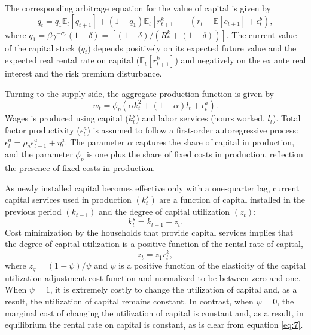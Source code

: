 \documentclass[11pt]{article}
\newcommand{\E}{\mathbb{E}}
\newcommand{\yobs}[1]{w_{#1}}
\newcommand{\lobs}[1]{l_{#1}}
\newcommand{\robs}[1]{r_{#1}}
\newcommand{\piobs}[1]{c_{#1}}
\newcommand{\Output}{Wages}
\newcommand{\hours}{hours worked}
\newcommand{\realinterest}{real interest}
\newcommand{\labor}{labor}
\begin{document}
The corresponding arbitrage equation for the value of capital is given
by \begin{equation}
q_t = q_1\E_t[q_{t+1}] + (1-q_1)\E_t[r_{t+1}^k] - (\robs{t} -
\E[\piobs{t+1}] + \epsilon_t^b),
\end{equation} where
\(q_1 = \beta\gamma^{-\sigma_c}(1-\delta) = [(1-\delta)/(R_*^k + (1-\delta))]\).
The current value of the capital stock (\(q_t\)) depends positively on
its expected future value and the expected real rental rate on capital
(\(\E_t[r_{t+1}^k]\)) and negatively on the ex ante \realinterest{} and
the risk premium disturbance.

Turning to the supply side, the aggregate production function is given
by \begin{equation}
  \yobs{t} = \phi_p(\alpha k_t^2 + (1-\alpha)\lobs{t} + \epsilon_t^a).
\end{equation} \Output{} is produced using capital (\(k_t^s\)) and
\labor{} services (\hours, \(\lobs{t}\)). Total factor productivity
(\(\epsilon_t^a\)) is assumed to follow a first-order autoregressive
process: \(\epsilon_t^a = \rho_a \epsilon_{t-1}^a + \eta_t^a\). The
parameter \(\alpha\) captures the share of capital in production, and
the parameter \(\phi_p\) is one plus the share of fixed costs in
production, reflection the presence of fixed costs in production.

As newly installed capital becomes effective only with a one-quarter
lag, current capital services used in production \((k_t^s)\) are a
function of capital installed in the previous period \((k_{t-1})\) and
the degree of capital utilization \((z_t)\): \begin{equation}
  k_t^s = k_{t-1} + z_t.
\end{equation} Cost minimization by the households that provide capital
services implies that the degree of capital utilization is a positive
function of the rental rate of capital, \begin{equation}
  \label{eq:7}
  z_t = z_1 r_t^k,
\end{equation} where \(z_q = (1-\psi)/\psi\) and \(\psi\) is a positive
function of the elasticity of the capital utilization adjustment cost
function and normalized to be between zero and one. When \(\psi=1\), it
is extremely costly to change the utilization of capital and, as a
result, the utilization of capital remains constant. In contrast, when
\(\psi=0\), the marginal cost of changing the utilization of capital is
constant and, as a result, in equilibrium the rental rate on capital is
constant, as is clear from equation \eqref{eq:7}.
\end{document}

